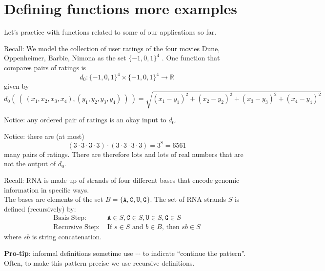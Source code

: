 \documentclass[12pt, oneside]{article}
\newcommand{\A}[0]{\texttt{A}}
\newcommand{\C}[0]{\texttt{C}}
\newcommand{\G}[0]{\texttt{G}}
\newcommand{\U}[0]{\texttt{U}}
\begin{document}
\section*{Defining functions more examples}


Let's practice with functions related to some of our applications so far.

Recall: We model the collection of user ratings of the four movies Dune, Oppenheimer, Barbie, Nimona as the set
$\{-1,0,1\}^4$ . One function that compares pairs of ratings is
$$d_0: \{-1,0,1\}^4 \times \{-1,0,1\}^4 \to \mathbb{R}$$
given by
\[
d_0 (~(~ (x_1, x_2, x_3, x_4), (y_1, y_2, y_3, y_4) ~) ~) = \sqrt{ (x_1 - y_1)^2 + (x_2 - y_2)^2 + (x_3 -y_3)^2 + (x_4 -y_4)^2}
\]

Notice: any ordered pair of ratings is an okay input to $d_0$.

Notice: there are (at most) 
\[
(3 \cdot 3 \cdot 3 \cdot 3)\cdot (3 \cdot 3 \cdot 3 \cdot 3) = 3^8 = 6561
\]
many pairs of ratings. There are therefore lots and lots of real numbers that are not the output of $d_0$.

\vfill

Recall: RNA is made up of strands of four different bases that encode genomic information
in specific ways.\\
The bases are elements of the set 
$B  = \{\A, \C, \U, \G \}$. The set of RNA strands $S$ is defined (recursively) by:
\[
\begin{array}{ll}
\textrm{Basis Step: } & \A \in S, \C \in S, \U \in S, \G \in S \\
\textrm{Recursive Step: } & \textrm{If } s \in S\textrm{ and }b \in B \textrm{, then }sb \in S
\end{array}
\]
where $sb$ is string concatenation.

\vfill
\newpage
{\bf Pro-tip}: informal definitions sometime use $\cdots$ to indicate ``continue the pattern''. Often, 
to make this pattern precise we use recursive definitions.

\vspace{-20pt}
\end{document}
